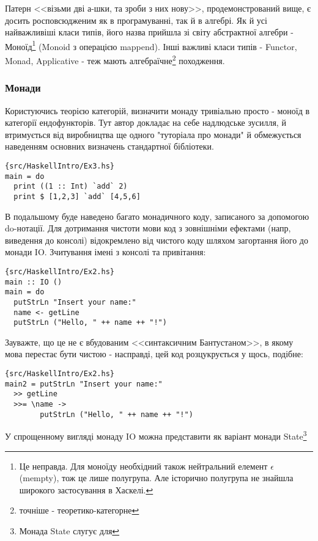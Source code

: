 \documentclass[12pt]{article}
\begin{document}
Патерн <<візьми дві а-шки, та зроби з них нову>>, продемонстрований вище, є досить росповсюдженим як в програмуванні, так й в алгебрі. Як й усі найважливіші класи типів, його назва прийшла зі світу абстрактної алгебри - Моноїд\footnote{Це неправда. Для моноїду необхідний також нейтральний елемент $\epsilon$ (mempty), тож це лише полугрупа. Але історично полугрупа не знайшла широкого застосування в Хаскелі.} (Monoid з операцією mappend). Інші важливі класи типів - Functor, Monad, Applicative - теж мають алгебраїчне\footnote{точніше - теоретико-категорне} походження.

\subsubsection*{Монади}

Користуючись теорією категорій, визначити монаду тривіально просто - моноїд в категорії ендофункторів. Тут автор докладає на себе надлюдське зусилля, й втримується від виробництва ще одного "туторіала про монади" й обмежується наведенням основних визначень стандартної бібліотеки.

\begin{lstlisting}{src/HaskellIntro/Ex3.hs}
main = do
  print ((1 :: Int) `add` 2)
  print $ [1,2,3] `add` [4,5,6]
\end{lstlisting}

В подальшому буде наведено багато монадичного коду, записаного за допомогою do-нотації. Для дотримання чистоти мови код з зовнішніми ефектами (напр, виведення до консолі) відокремлено від чистого коду шляхом загортання його до монади IO. Зчитування імені з консолі та привітання:\\

\begin{lstlisting}{src/HaskellIntro/Ex2.hs}
main :: IO ()
main = do
  putStrLn "Insert your name:"
  name <- getLine
  putStrLn ("Hello, " ++ name ++ "!")
\end{lstlisting}

Зауважте, що це не є вбудованим <<синтаксичним Бантустаном>>, в якому мова перестає бути чистою - насправді, цей код розцукрується у щось, подібне:\\

\begin{lstlisting}{src/HaskellIntro/Ex2.hs}
main2 = putStrLn "Insert your name:"
  >> getLine
  >>= \name ->
        putStrLn ("Hello, " ++ name ++ "!")
\end{lstlisting}

У спрощенному вигляді монаду IO можна представити як варіант монади State\footnote{Монада State слугує для }
\end{document}
